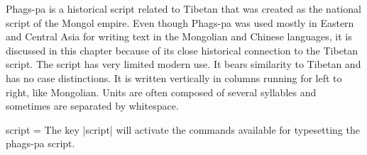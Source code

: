 Phags-pa is a historical script related to Tibetan that was created as the national script of
the Mongol empire. Even though Phags-pa was used mostly in Eastern and Central Asia for
writing text in the Mongolian and Chinese languages, it is discussed in this chapter because
of its close historical connection to the Tibetan script. The script has very limited modern use. It bears similarity to Tibetan and has no case distinctions. It is written vertically in columns running for left to right, like Mongolian. Units are often composed of several syllables and sometimes are separated by whitespace.




\begin{docKey}[phd]{script}{ = } {}
The key |script| will activate the commands available for typesetting the phags-pa script.
\end{docKey}













